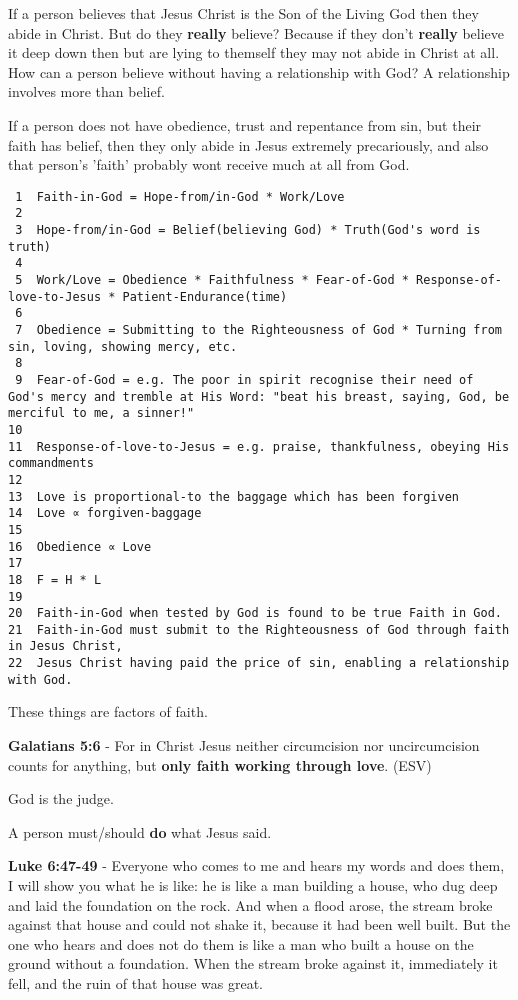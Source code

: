 \documentclass[11pt]{article}
\begin{document}
If a person believes that Jesus Christ is the Son of the Living God then they abide in Christ.
But do they \textbf{really} believe? Because if they don't \textbf{really} believe it deep down then but are lying to themself they may not abide in Christ at all.
How can a person believe without having a relationship with God? A relationship involves more than belief.

If a person does not have obedience, trust and
repentance from sin, but their faith has belief, then they only
abide in Jesus extremely precariously, and also that person's 'faith' probably wont receive much at all from God.

\begin{verbatim}
 1  Faith-in-God = Hope-from/in-God * Work/Love
 2  
 3  Hope-from/in-God = Belief(believing God) * Truth(God's word is truth)
 4  
 5  Work/Love = Obedience * Faithfulness * Fear-of-God * Response-of-love-to-Jesus * Patient-Endurance(time)
 6  
 7  Obedience = Submitting to the Righteousness of God * Turning from sin, loving, showing mercy, etc.
 8  
 9  Fear-of-God = e.g. The poor in spirit recognise their need of God's mercy and tremble at His Word: "beat his breast, saying, God, be merciful to me, a sinner!"
10  
11  Response-of-love-to-Jesus = e.g. praise, thankfulness, obeying His commandments
12  
13  Love is proportional-to the baggage which has been forgiven
14  Love ∝ forgiven-baggage
15  
16  Obedience ∝ Love
17  
18  F = H * L
19  
20  Faith-in-God when tested by God is found to be true Faith in God.
21  Faith-in-God must submit to the Righteousness of God through faith in Jesus Christ,
22  Jesus Christ having paid the price of sin, enabling a relationship with God.
\end{verbatim}

These things are factors of faith.

\textbf{Galatians 5:6} - For in Christ Jesus neither circumcision nor uncircumcision counts for anything, but \textbf{only faith working through love}. (ESV)

God is the judge.

A person must/should \textbf{do} what Jesus said.

\textbf{Luke 6:47-49} - Everyone who comes to me and hears my words and does them, I will show you what he is like: he is like a man building a house, who dug deep and laid the foundation on the rock. And when a flood arose, the stream broke against that house and could not shake it, because it had been well built.  But the one who hears and does not do them is like a man who built a house on the ground without a foundation. When the stream broke against it, immediately it fell, and the ruin of that house was great.
\end{document}
